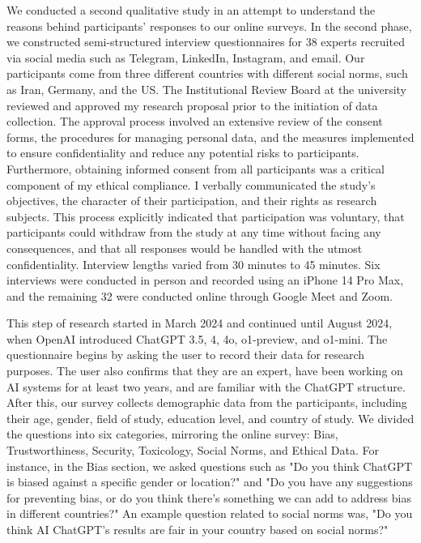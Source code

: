 \documentclass[sigconf]{acmart}
\begin{document}
We conducted a second qualitative study in an attempt to understand the reasons behind participants' responses to our online surveys. In the second phase, we constructed semi-structured interview questionnaires for 38 experts recruited via social media such as Telegram, LinkedIn, Instagram, and email. Our participants come from three different countries with different social norms, such as Iran, Germany, and the US. The Institutional Review Board at the university reviewed and approved my research proposal prior to the initiation of data collection. The approval process involved an extensive review of the consent forms, the procedures for managing personal data, and the measures implemented to ensure confidentiality and reduce any potential risks to participants. Furthermore, obtaining informed consent from all participants was a critical component of my ethical compliance. I verbally communicated the study's objectives, the character of their participation, and their rights as research subjects. This process explicitly indicated that participation was voluntary, that participants could withdraw from the study at any time without facing any consequences, and that all responses would be handled with the utmost confidentiality. Interview lengths varied from 30 minutes to 45 minutes. Six interviews were conducted in person and recorded using an iPhone 14 Pro Max, and the remaining 32 were conducted online through Google Meet and Zoom.

This step of research started in March 2024 and continued until August 2024, when OpenAI introduced ChatGPT 3.5, 4, 4o, o1-preview, and o1-mini. The questionnaire begins by asking the user to record their data for research purposes. The user also confirms that they are an expert, have been working on AI systems for at least two years, and are familiar with the ChatGPT structure. After this, our survey collects demographic data from the participants, including their age, gender, field of study, education level, and country of study. We divided the questions into six categories, mirroring the online survey: Bias, Trustworthiness, Security, Toxicology, Social Norms, and Ethical Data. For instance, in the Bias section, we asked questions such as "Do you think ChatGPT is biased against a specific gender or location?" and "Do you have any suggestions for preventing bias, or do you think there's something we can add to address bias in different countries?" An example question related to social norms was, "Do you think AI ChatGPT's results are fair in your country based on social norms?"
\end{document}
